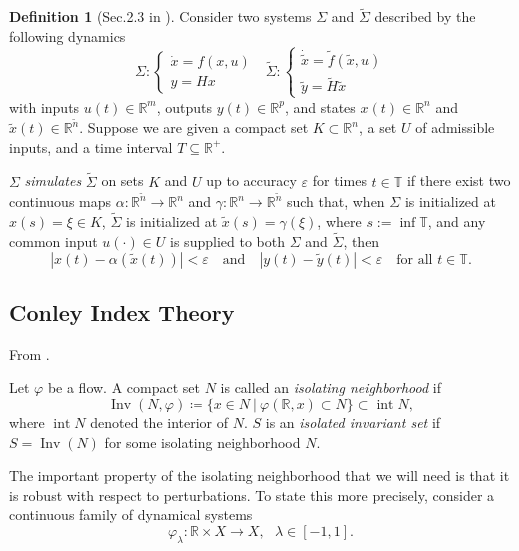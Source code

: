 \documentclass{article}
\theoremstyle{definition}
\newtheorem{definition}{Definition}
\theoremstyle{remark}
\newcommand{\reals}{\mathbb{R}}
\newcommand{\inv}{\operatorname{Inv}}
\newcounter{ct}
\begin{document}
\begin{definition}[Sec.2.3 in \citep{sontag1992neural}]\label{def:simulation}
Consider two systems $\Sigma$ and $\tilde\Sigma$ described by the following dynamics 
\begin{equation}
    \Sigma: \begin{cases}
        \dot x = f (x, u)\\ y = Hx
    \end{cases}
    \ \ \ 
    \tilde\Sigma: \begin{cases}
        \dot{\tilde x} = \tilde f (\tilde x, u)\\ \tilde y = \tilde H\tilde x
    \end{cases}
\end{equation} 
with inputs $u(t) \in \mathbb{R}^m$, outputs $y(t) \in \mathbb{R}^p$, and states $x(t) \in \mathbb{R}^n$ and $\tilde{x}(t) \in \mathbb{R}^{\tilde{n}}$. Suppose we are given a compact set $K \subset \mathbb{R}^n$, a set $U$ of admissible inputs, and a time interval $T \subseteq \mathbb{R}^+$.

$\Sigma$ \emph{simulates} $\tilde{\Sigma}$ on sets $K$ and $U$ up to accuracy $\varepsilon$ for times $t \in \mathbb{T}$ if there exist two continuous maps $\alpha : \mathbb{R}^{\tilde{n}} \to \mathbb{R}^n$ and $\gamma : \mathbb{R}^n \to \mathbb{R}^{\tilde{n}}$ such that, when $\Sigma$ is initialized at $x(s) = \xi \in K$, $\tilde{\Sigma}$ is initialized at $\tilde{x}(s) = \gamma(\xi)$, where $s := \inf \mathbb{T}$, and any common input $u(\cdot) \in U$ is supplied to both $\Sigma$ and $\tilde{\Sigma}$, then
\[
|x(t) - \alpha(\tilde{x}(t))| < \varepsilon \quad \text{and} \quad |y(t) - \tilde{y}(t)| < \varepsilon \quad \text{for all } t \in \mathbb{T}.
\]
\end{definition}

\subsection{Conley Index Theory}\label{sec:cit}
From \citet{mischaikow1999cit}.

Let $\varphi$ be a flow. A compact set $N$ is called an \emph{isolating neighborhood} if 
\[
\inv(N,\varphi) \coloneqq \{x\in N\ | \ \varphi(\reals,x)\subset N\} \subset \operatorname{int} N,
\]
where $ \operatorname{int} N$ denoted the interior of $N$. 
$S$ is an \emph{isolated invariant set} if $S=\inv(N)$ for some isolating neighborhood $N$.

The important property of the isolating neighborhood that we will need is that it is robust with respect to perturbations. To state this more precisely, consider a continuous family of dynamical systems
\begin{equation}
\varphi_\lambda\colon \reals\times X\rightarrow X, \ \ \ \lambda\in[-1,1].
\end{equation}
\end{document}
